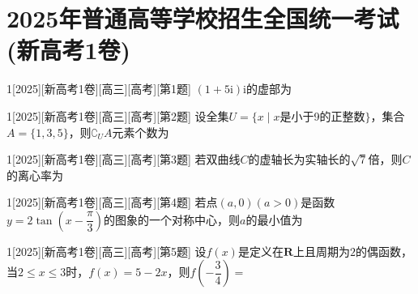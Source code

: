 \section{2025年普通高等学校招生全国统一考试(新高考1卷)}
\begin{example}{1}[2025][新高考1卷][高三][高考][第1题]
$(1+5\text{i})\text{i}$的虚部为\blankbox
\begin{choices}
\end{choices}
\end{example}

\begin{example}{1}[2025][新高考1卷][高三][高考][第2题]
设全集$U=\{x\mid x$是小于9的正整数$\}$，集合$A=\{1,3,5\}$，则$\complement_U A$元素个数为\blankbox
\begin{choices}
\end{choices}
\end{example}

\begin{example}{1}[2025][新高考1卷][高三][高考][第3题]
若双曲线$C$的虚轴长为实轴长的$\sqrt{7}$倍，则$C$的离心率为\blankbox
\begin{choices}
\end{choices}
\end{example}

\begin{example}{1}[2025][新高考1卷][高三][高考][第4题]
若点$(a,0)(a>0)$是函数$y=2\tan\left(x-\dfrac{\pi}{3}\right)$的图象的一个对称中心，则$a$的最小值为\blankbox
\begin{choices}
\end{choices}
\end{example}

\begin{example}{1}[2025][新高考1卷][高三][高考][第5题]
设$f(x)$是定义在$\mathbf{R}$上且周期为$2$的偶函数，当$2\le x\le 3$时，$f(x)=5-2x$，则$f\left(-\dfrac{3}{4}\right)=$\blankbox
\begin{choices}
\end{choices}
\end{example}

